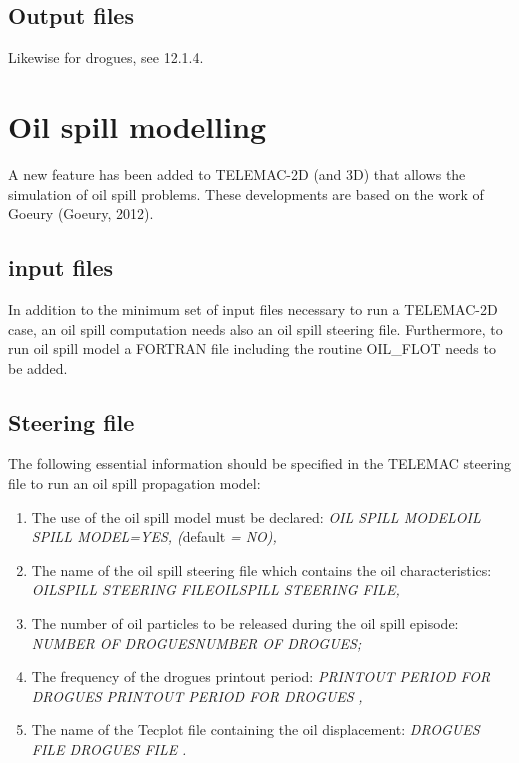 \subsection{ Output files}

 Likewise for drogues, see 12.1.4.


\section{ Oil spill modelling}

 A new feature has been added to TELEMAC-2D (and 3D) that allows the simulation of oil spill problems. These developments are based on the work of Goeury (Goeury, 2012).


\subsection{ input files}

 In addition to the minimum set of input files necessary to run a TELEMAC-2D case, an oil spill computation needs also an oil spill steering file. Furthermore, to run oil spill model a FORTRAN file including the routine OIL\_FLOT needs to be added.


\subsection{ Steering file}

 The following essential information should be specified in the TELEMAC steering file to run an oil spill propagation model:

\begin{enumerate}
\item  The use of the oil spill model must be declared: \textit{OIL SPILL MODELOIL SPILL MODEL=YES, (}default\textit{ = NO),}

\item  The name of the oil spill steering file which contains the oil characteristics: \textit{OILSPILL STEERING FILEOILSPILL STEERING FILE,}

\item  The number of oil particles to be released during the oil spill episode: \textit{NUMBER OF DROGUESNUMBER OF DROGUES;}

\item  The frequency of the drogues printout period: \textit{PRINTOUT PERIOD FOR DROGUES PRINTOUT PERIOD FOR DROGUES} \textit{,}

\item  The name of the Tecplot file containing the oil displacement: \textit{DROGUES FILE DROGUES FILE} \textit{.}
\end{enumerate}

